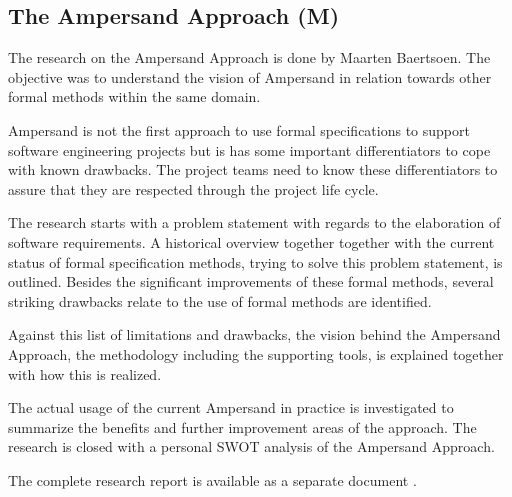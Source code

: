 

\subsection{The Ampersand Approach (M)}
\label{domain:approach}
The research on the Ampersand Approach is done by Maarten Baertsoen.
The objective was to understand the vision of Ampersand in relation towards other formal methods within the same domain.

Ampersand is not the first approach to use formal specifications to support software engineering projects but is has some important differentiators to cope with known drawbacks.
The project teams need to know these differentiators to assure that they are respected through the project life cycle.

The research starts with a problem statement with regards to the elaboration of software requirements.
A historical overview together together with the current status of formal specification methods, trying to solve this problem statement, is outlined.
Besides the significant improvements of these formal methods, several striking drawbacks relate to the use of formal methods are identified.

Against this list of limitations and drawbacks, the vision behind the Ampersand Approach, the methodology including the supporting tools, is explained together with how this is realized.

The actual usage of the current Ampersand in practice is investigated to summarize the benefits and further improvement areas of the approach.
The research is closed with a personal SWOT analysis of the Ampersand Approach.

The complete research report is available as a separate document .